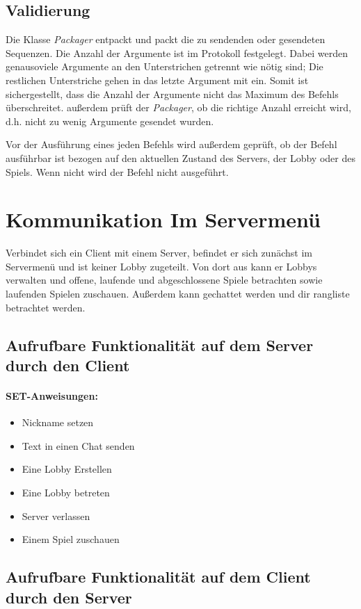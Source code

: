 \documentclass[a4paper, 12pt, oneside, headsepline=.5pt,footsepline=.5pt]{scrartcl}
\begin{document}
\subsection{Validierung}
Die Klasse \textit{Packager} entpackt und packt die zu sendenden oder gesendeten Sequenzen. Die Anzahl der Argumente ist im Protokoll festgelegt. Dabei werden genausoviele Argumente an den Unterstrichen getrennt wie nötig sind; Die restlichen Unterstriche gehen in das letzte Argument mit ein. Somit ist sichergestellt, dass die Anzahl der Argumente nicht das Maximum des Befehls überschreitet. außerdem prüft der \textit{Packager}, ob die richtige Anzahl erreicht wird, d.h. nicht zu wenig Argumente gesendet wurden.

Vor der Ausführung eines jeden Befehls wird außerdem geprüft, ob der Befehl ausführbar ist bezogen auf den aktuellen Zustand des Servers, der Lobby oder des Spiels. Wenn nicht wird der Befehl nicht ausgeführt.


\section{Kommunikation Im Servermenü}
Verbindet sich ein Client mit einem Server, befindet er sich zunächst im Servermenü und ist keiner Lobby zugeteilt. Von dort aus kann er Lobbys verwalten und offene, laufende und abgeschlossene Spiele betrachten sowie laufenden Spielen zuschauen. Außerdem kann gechattet werden und dir rangliste betrachtet werden.

\subsection{Aufrufbare Funktionalität auf dem Server durch den Client}

\paragraph{\textbf SET-Anweisungen:}
\begin{itemize}
\item Nickname setzen
\item Text in einen Chat senden
\item Eine Lobby Erstellen
\item Eine Lobby betreten
\item Server verlassen
\item Einem Spiel zuschauen
\end{itemize}


\subsection{Aufrufbare Funktionalität auf dem Client durch den Server}
\end{document}
